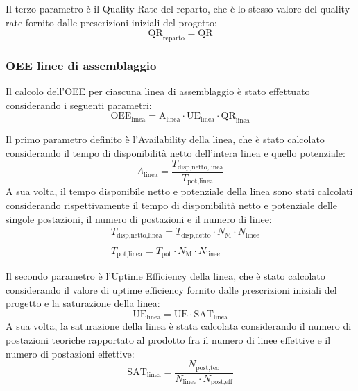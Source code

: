 \documentclass[11pt]{article}
\begin{document}
Il terzo parametro è il Quality Rate del reparto, che è lo stesso valore del quality rate fornito dalle prescrizioni iniziali del progetto:
\begin{equation}
    \text{QR}_\text{reparto} = \text{QR}
\end{equation}

\newpage

\subsubsection{OEE linee di assemblaggio}
Il calcolo dell'OEE per ciascuna linea di assemblaggio è stato effettuato considerando i seguenti parametri:
\begin{equation}
    \text{OEE}_\text{linea} = \text{A}_\text{linea} \cdot \text{UE}_\text{linea} \cdot \text{QR}_\text{linea}
\end{equation}

Il primo parametro definito è l'Availability della linea, che è stato calcolato considerando il tempo di disponibilità netto dell'intera linea e quello potenziale:
\begin{equation}
    A_\text{linea} = \frac{T_\text{disp,netto,linea}}{T_\text{pot,linea}}
\end{equation}
A sua volta, il tempo disponibile netto e potenziale della linea sono stati calcolati considerando rispettivamente il tempo di disponibilità netto e potenziale delle singole postazioni, il numero di postazioni e il numero di linee:
\begin{equation}
    \begin{aligned}
        & T_\text{disp,netto,linea} = T_\text{disp,netto} \cdot N_\text{M} \cdot N_\text{linee} \\\ \\
        & T_\text{pot,linea} = T_\text{pot} \cdot N_\text{M} \cdot N_\text{linee}
    \end{aligned}
\end{equation}

Il secondo parametro è l'Uptime Efficiency della linea, che è stato calcolato considerando il valore di uptime efficiency fornito dalle prescrizioni iniziali del progetto e la saturazione della linea:
\begin{equation}
    \text{UE}_\text{linea} = \text{UE} \cdot \text{SAT}_\text{linea}
\end{equation}
A sua volta, la saturazione della linea è stata calcolata considerando il numero di postazioni teoriche rapportato al prodotto fra il numero di linee effettive e il numero di postazioni effettive:
\begin{equation}
    \text{SAT}_\text{linea} = \frac{N_\text{post,teo}}{N_\text{linee} \cdot N_\text{post,eff}}
\end{equation}
\end{document}
